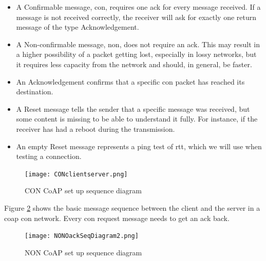 
\begin{itemize}
	\item A Confirmable message, \gls{con}, requires one \gls{ack} for every message received. If a message is not received correctly, the receiver will ask for exactly one return message of the type Acknowledgement. 
	\item A Non-confirmable message, \gls{non}, does not require an \gls{ack}. This may result in a higher possibility of a packet getting lost, especially in lossy networks, but it requires less capacity from the network and should, in general, be faster. 
	\item An Acknowledgement confirms that a specific \gls{con} packet has reached its destination. 
	\item A Reset message tells the sender that a specific message was received, but some content is missing to be able to understand it fully. For instance, if the receiver has had a reboot during the transmission. 
	\item An empty Reset message represents a ping test of \gls{rtt}, which we will use when testing a connection. 
\end{itemize}
       


\begin{figure}[ht]
    \centering
    \texttt{[image: CONclientserver.png]}    
    \caption{CON CoAP set up sequence diagram \cite{shelby2014constrained}}
    \label{fig:CONclientserver}
\end{figure}

\noindent Figure \ref{fig:NONOackSeqDiagram} shows the basic message sequence between the client and the server in a \gls{coap} \gls{con} network. Every \gls{con} request message needs to get an \gls{ack} back. 

\begin{figure}[ht]
    \centering
    \texttt{[image: NONOackSeqDiagram2.png]}    
    \caption{NON CoAP set up sequence diagram \cite{shelby2014constrained}}
    \label{fig:NONOackSeqDiagram}
\end{figure}


